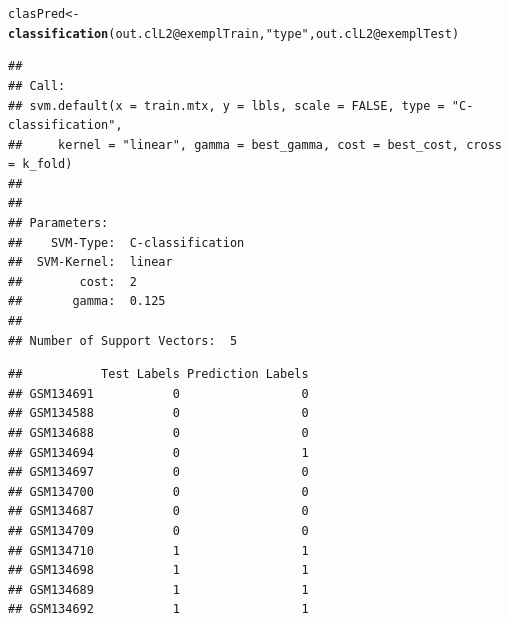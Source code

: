 \documentclass[12pt]{article}\usepackage[]{graphicx}\usepackage[usenames,dvipsnames]{color}
\makeatletter
\newcommand{\hlstr}[1]{\textcolor[rgb]{0.192,0.494,0.8}{#1}}%
\newcommand{\hlopt}[1]{\textcolor[rgb]{0,0,0}{#1}}%
\newcommand{\hlstd}[1]{\textcolor[rgb]{0.345,0.345,0.345}{#1}}%
\newcommand{\hlkwb}[1]{\textcolor[rgb]{0.69,0.353,0.396}{#1}}%
\newcommand{\hlkwc}[1]{\textcolor[rgb]{0.333,0.667,0.333}{#1}}%
\newcommand{\hlkwd}[1]{\textcolor[rgb]{0.737,0.353,0.396}{\textbf{#1}}}%
\newenvironment{kframe}{%
 \def\at@end@of@kframe{}%
 \ifinner\ifhmode%
  \def\at@end@of@kframe{\end{minipage}}%
  \begin{minipage}{\columnwidth}%
 \fi\fi%
 \def\FrameCommand##1{\hskip\@totalleftmargin \hskip-\fboxsep
 \colorbox{shadecolor}{##1}\hskip-\fboxsep
     \hskip-\linewidth \hskip-\@totalleftmargin \hskip\columnwidth}%
 \MakeFramed {\advance\hsize-\width
   \@totalleftmargin\z@ \linewidth\hsize
   \@setminipage}}%
 {\par\unskip\endMakeFramed%
 \at@end@of@kframe}
\newenvironment{knitrout}{}{} %
\makeatother
\begin{document}
\begin{knitrout}
\color{fgcolor}\begin{kframe}
\begin{alltt}
\hlstd{clasPred} \hlkwb{<-} \hlkwd{classification}\hlstd{(out.clL2}\hlopt{@}\hlkwc{exemplTrain}\hlstd{,} \hlstr{"type"}\hlstd{, out.clL2}\hlopt{@}\hlkwc{exemplTest}\hlstd{)}
\end{alltt}


{\ttfamily\noindent\itshape\color{messagecolor}{\#\# The training set has 12 Negative and 6 Positive samples. Using k-fold=5 C-V}}

{\ttfamily\noindent\itshape\color{messagecolor}{\#\# \#\#\#\#\#\#\#\#\#\#\#\# THE BEST PARAMETERS TUNING STAGE \#\#\#\#\#\#\#\#\#\#\#\#\#\#\#\#\#\#}}

{\ttfamily\noindent\itshape\color{messagecolor}{\#\# \#\#\#\#\#\#\#\#\#\#\#\#\# THE TRAINING STAGE \#\#\#\#\#\#\#\#\#\#\#\#\#\#\#\#\#\#\#\#\#\#\#\#}}\begin{verbatim}
## 
## Call:
## svm.default(x = train.mtx, y = lbls, scale = FALSE, type = "C-classification", 
##     kernel = "linear", gamma = best_gamma, cost = best_cost, cross = k_fold)
## 
## 
## Parameters:
##    SVM-Type:  C-classification 
##  SVM-Kernel:  linear 
##        cost:  2 
##       gamma:  0.125 
## 
## Number of Support Vectors:  5
\end{verbatim}


{\ttfamily\noindent\itshape\color{messagecolor}{\#\# \#\#\#\#\#\#\#\#\#\#\#\#\# THE PREDICTION STAGE \#\#\#\#\#\#\#\#\#\#\#\#\#\#\#\#\#\#\#\#\#\#}}\begin{verbatim}
##           Test Labels Prediction Labels
## GSM134691           0                 0
## GSM134588           0                 0
## GSM134688           0                 0
## GSM134694           0                 1
## GSM134697           0                 0
## GSM134700           0                 0
## GSM134687           0                 0
## GSM134709           0                 0
## GSM134710           1                 1
## GSM134698           1                 1
## GSM134689           1                 1
## GSM134692           1                 1
\end{verbatim}


{\ttfamily\noindent\itshape\color{messagecolor}{\#\# Negative samples: 8}}

{\ttfamily\noindent\itshape\color{messagecolor}{\#\# Positive samples: 4}}

{\ttfamily\noindent\itshape\color{messagecolor}{\#\# TN=7}}


\end{kframe}
\end{knitrout}
\end{document}

